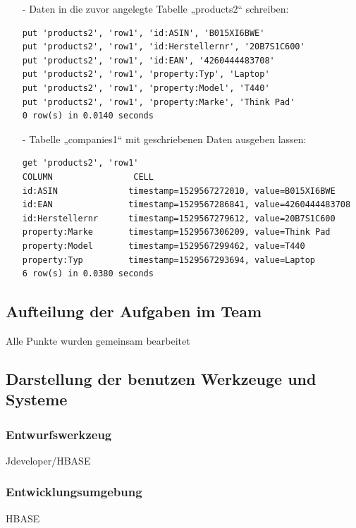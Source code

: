 \begin{itemize}
\item[-] Daten in die zuvor angelegte Tabelle „products2“ schreiben:
\begin{lstlisting}
put 'products2', 'row1', 'id:ASIN', 'B015XI6BWE'
put 'products2', 'row1', 'id:Herstellernr', '20B7S1C600'
put 'products2', 'row1', 'id:EAN', '4260444483708'
put 'products2', 'row1', 'property:Typ', 'Laptop'
put 'products2', 'row1', 'property:Model', 'T440'
put 'products2', 'row1', 'property:Marke', 'Think Pad'
0 row(s) in 0.0140 seconds
\end{lstlisting}

\item[-] Tabelle „companies1“ mit geschriebenen Daten ausgeben lassen:
\begin{lstlisting}
get 'products2', 'row1'
COLUMN                CELL
id:ASIN              timestamp=1529567272010, value=B015XI6BWE
id:EAN               timestamp=1529567286841, value=4260444483708
id:Herstellernr      timestamp=1529567279612, value=20B7S1C600
property:Marke       timestamp=1529567306209, value=Think Pad
property:Model       timestamp=1529567299462, value=T440
property:Typ         timestamp=1529567293694, value=Laptop
6 row(s) in 0.0380 seconds
\end{lstlisting}
\end{itemize}
\subsection*{Aufteilung der Aufgaben im Team}
Alle Punkte wurden gemeinsam bearbeitet
\subsection*{Darstellung der benutzen Werkzeuge und Systeme}

\subsubsection*{Entwurfswerkzeug}
Jdeveloper/HBASE
\subsubsection*{Entwicklungsumgebung}
HBASE
